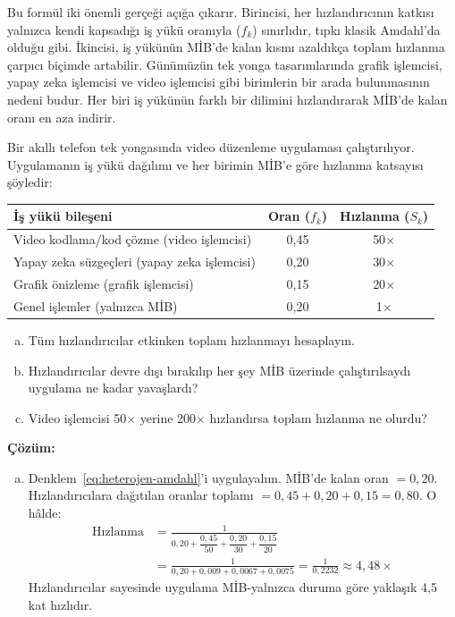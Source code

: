Bu formül iki önemli gerçeği açığa çıkarır. Birincisi, her hızlandırıcının katkısı yalnızca kendi kapsadığı iş yükü oranıyla ($f_k$) sınırlıdır, tıpkı klasik Amdahl'da olduğu gibi. İkincisi, iş yükünün MİB'de kalan kısmı azaldıkça toplam hızlanma çarpıcı biçimde artabilir. Günümüzün tek yonga tasarımlarında grafik işlemcisi, yapay zeka işlemcisi ve video işlemcisi gibi birimlerin bir arada bulunmasının nedeni budur. Her biri iş yükünün farklı bir dilimini hızlandırarak MİB'de kalan oranı en aza indirir.

\begin{ornek}[2.12]
Bir akıllı telefon tek yongasında video düzenleme uygulaması çalıştırılıyor. Uygulamanın iş yükü dağılımı ve her birimin MİB'e göre hızlanma katsayısı şöyledir:

\begin{center}
\small
\begin{tabular}{lcc}
\toprule
\textbf{İş yükü bileşeni} & \textbf{Oran ($f_k$)} & \textbf{Hızlanma ($S_k$)} \\
\midrule
Video kodlama/kod çözme (video işlemcisi) & 0,45 & 50$\times$ \\
Yapay zeka süzgeçleri (yapay zeka işlemcisi) & 0,20 & 30$\times$ \\
Grafik önizleme (grafik işlemcisi)          & 0,15 & 20$\times$ \\
Genel işlemler (yalnızca MİB)          & 0,20 & 1$\times$ \\
\bottomrule
\end{tabular}
\end{center}

\begin{enumerate}[(a)]
    \item Tüm hızlandırıcılar etkinken toplam hızlanmayı hesaplayın.
    \item Hızlandırıcılar devre dışı bırakılıp her şey MİB üzerinde çalıştırılsaydı uygulama ne kadar yavaşlardı?
    \item Video işlemcisi 50$\times$ yerine 200$\times$ hızlandırsa toplam hızlanma ne olurdu?
\end{enumerate}

\textbf{Çözüm:}
\begin{enumerate}[(a)]
    \item Denklem~\ref{eq:heterojen-amdahl}'i uygulayalım. MİB'de kalan oran $= 0{,}20$. Hızlandırıcılara dağıtılan oranlar toplamı $= 0{,}45 + 0{,}20 + 0{,}15 = 0{,}80$. O hâlde:
    \begin{align*}
    \text{Hızlanma} &= \frac{1}{0{,}20 + \dfrac{0{,}45}{50} + \dfrac{0{,}20}{30} + \dfrac{0{,}15}{20}} \\[6pt]
    &= \frac{1}{0{,}20 + 0{,}009 + 0{,}0067 + 0{,}0075}
    = \frac{1}{0{,}2232}
    \approx 4{,}48\times
    \end{align*}
    Hızlandırıcılar sayesinde uygulama MİB-yalnızca duruma göre yaklaşık 4,5 kat hızlıdır.


\end{enumerate}
\end{ornek}
